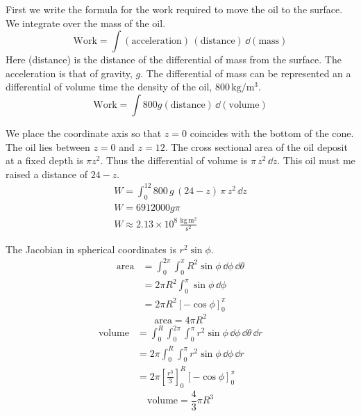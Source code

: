 \begin{Solution}
  \label{solution oil work}
  First we write the formula for the work required to move the oil to 
  the surface.  We integrate over the mass of the oil.
  \[
  \mathrm{Work} = \int (\mathrm{acceleration})\,(\mathrm{distance})\,\dd (\mathrm{mass})
  \]
  Here (distance) is the distance of the differential of mass from the 
  surface.  The acceleration is that of gravity, $g$.  The differential
  of mass can be represented an a differential of volume time the density 
  of the oil, $800\, \mathrm{kg} / \mathrm{m}^3$.
  \[
  \mathrm{Work} = \int 800 g (\mathrm{distance}) \,\dd (\mathrm{volume})
  \]

  We place the coordinate axis so that $z = 0$ coincides with the bottom 
  of the cone.  The oil lies between $z = 0$ and $z = 12$.  The cross
  sectional area of the oil deposit at a fixed depth is $\pi z^2$.  Thus the 
  differential of volume is $\pi\, z^2\, \dd z$.
  This oil must me raised a distance of $24 - z$.
  \begin{gather*}
    W = \int_0^{12} 800\, g\, (24 - z)\, \pi\, z^2\, \dd z
    \\
    W = 6912000 g \pi
    \\
    \boxed{
      W \approx 2.13 \times 10^8 \, \frac{ \mathrm{kg}\, \mathrm{m}^2 }{ \mathrm{s}^2 }
      }
  \end{gather*}
\end{Solution}



\begin{Solution}
  \label{solution area volume sphere}
  The Jacobian in spherical coordinates is $r^2 \sin \phi$.
  \begin{align*}
    \mathrm{area} 
    &= \int_0^{2 \pi} \int_0^\pi R^2 \sin \phi \,\dd \phi \,\dd \theta
    \\
    &= 2 \pi R^2 \int_0^\pi \sin \phi \,\dd \phi
    \\
    &= 2 \pi R^2 [- \cos \phi]_0^\pi
  \end{align*}
  \[
  \boxed{
    \mathrm{area} = 4 \pi R^2
    }
  \]
  \begin{align*}
    \mathrm{volume} 
    &= \int_0^R \int_0^{2 \pi} \int_0^\pi r^2 \sin \phi \,\dd \phi \,\dd \theta \,\dd r
    \\
    &= 2 \pi \int_0^R \int_0^\pi r^2 \sin \phi \,\dd \phi \,\dd r
    \\
    &= 2 \pi \left[ \frac{r^3}{3} \right]_0^R [- \cos \phi ]_0^\pi
  \end{align*}
  \[
  \boxed{
    \mathrm{volume} = \frac{4}{3} \pi R^3
    }
  \]
\end{Solution}


